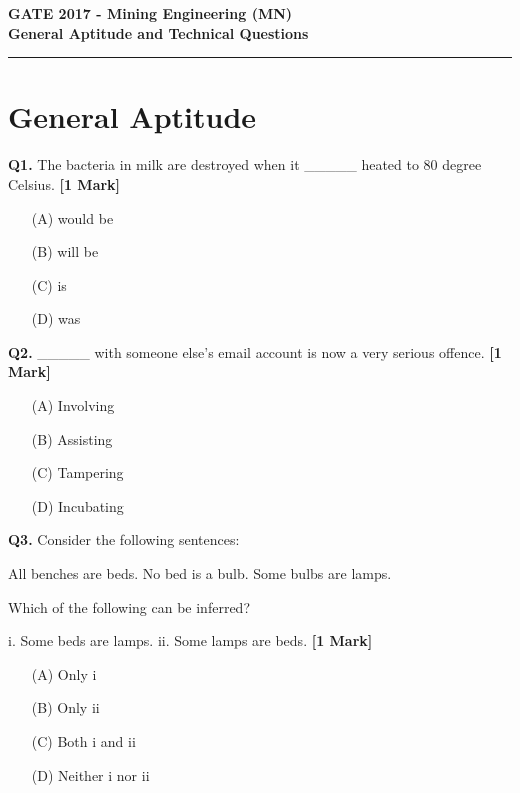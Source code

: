 \documentclass[11pt]{article}
\newcommand{\questiona}[2]{
    \noindent\textbf{Q#2.} #1 \hfill \textbf{[1 Mark]}
}
\begin{document}
\begin{center}
    \Large\textbf{GATE 2017 - Mining Engineering (MN)} \\
    \large\textbf{General Aptitude and Technical Questions} \\
    \rule{\textwidth}{0.5pt} %
\end{center}

\vspace{0.5cm}

\section*{General Aptitude}

\questiona{The bacteria in milk are destroyed when it \_\_\_\_\_ heated to 80 degree Celsius.}{1}
\begin{enumerate}
    \item[(A)] would be  
    \item[(B)] will be  
    \item[(C)] is  
    \item[(D)] was  
\end{enumerate}
\vspace{0.5cm}

\questiona{\_\_\_\_\_ with someone else's email account is now a very serious offence.}{2}
\begin{enumerate}
    \item[(A)] Involving  
    \item[(B)] Assisting  
    \item[(C)] Tampering  
    \item[(D)] Incubating  
\end{enumerate}
\vspace{0.5cm}

\questiona{Consider the following sentences:

All benches are beds. No bed is a bulb. Some bulbs are lamps.

Which of the following can be inferred?

i. Some beds are lamps.
ii. Some lamps are beds.}{3}
\begin{enumerate}
    \item[(A)] Only i  
    \item[(B)] Only ii  
    \item[(C)] Both i and ii  
    \item[(D)] Neither i nor ii  
\end{enumerate}
\vspace{0.5cm}
\end{document}
